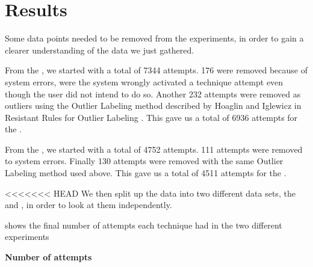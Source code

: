 \section{Results}\label{sec:results}

Some data points needed to be removed from the experiments, in order to gain a clearer understanding of the data we just gathered. 


From the \target, we started with a total of 7344 attempts.
176 were removed because of system errors, were the system wrongly activated a technique attempt even though the user did not intend to do so.
Another 232 attempts were removed as outliers using the Outlier Labeling method described by Hoaglin and Iglewicz in Resistant Rules for Outlier Labeling \cite{Hoaglin:1987}.
This gave us a total of 6936 attempts for the \target.

From the \accuracy, we started with a total of 4752 attempts.
111 attempts were removed to system errors. 
Finally 130 attempts were removed with the same Outlier Labeling method used above.
This gave us a total of 4511 attempts for the \accuracy.

<<<<<<< HEAD
We then split up the data into two different data sets, the \push and \pull, in order to look at them independently. 

 shows the final number of attempts each technique had in the two different experiments

\begin{table}[H]
	\centering
	\textbf{Number of attempts}\\[4pt]
	\begin{adjustbox}{width=\columnwidth}
	\end{adjustbox}
	\caption{Number of attempts for each technique in each experiment}
	\label{tab:numberOfAttempts}
\end{table}


